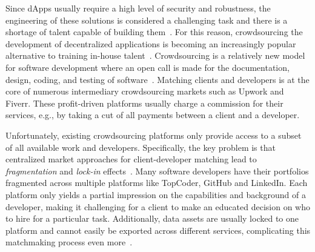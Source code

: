 Since dApps usually require a high level of security and robustness, the engineering of these solutions is considered a challenging task and there is a shortage of talent capable of building them~\cite{shortage2016nasdaq}.
For this reason, crowdsourcing the development of decentralized applications is becoming an increasingly popular alternative to training in-house talent~\cite{gong2021reference}.
Crowdsourcing is a relatively new model for software development where an open call is made for the documentation, design, coding, and testing of software~\cite{latoza2016crowdsourcing}.
Matching clients and developers is at the core of numerous intermediary crowdsourcing markets such as Upwork and Fiverr.
These profit-driven platforms usually charge a commission for their services, e.g., by taking a cut of all payments between a client and a developer.

Unfortunately, existing crowdsourcing platforms only provide access to a subset of all available work and developers.
Specifically, the key problem is that centralized market approaches for client-developer matching lead to \emph{fragmentation} and \emph{lock-in} effects~\cite{pouwelse2017laws,gong2021reference}.
Many software developers have their portfolios fragmented across multiple platforms like TopCoder, GitHub and LinkedIn.
Each platform only yields a partial impression on the capabilities and background of a developer, making it challenging for a client to make an educated decision on who to hire for a particular task.
Additionally, data assets are usually locked to one platform and cannot easily be exported across different services, complicating this matchmaking process even more~\cite{hesse2019reputation}.


